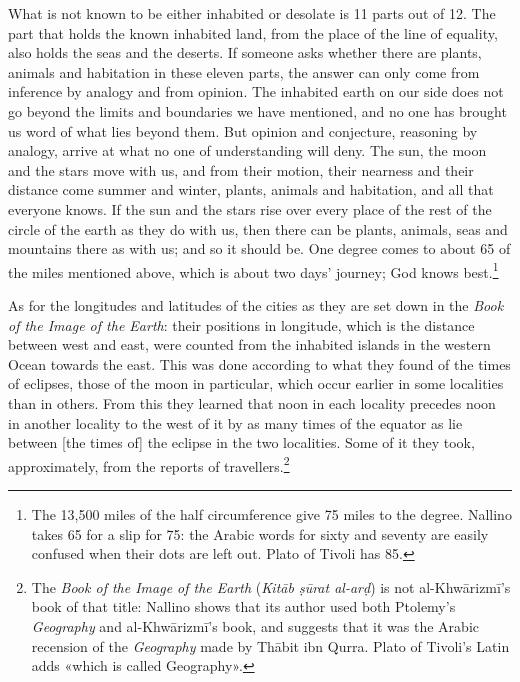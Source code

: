 \documentclass[11pt]{article}
\begin{document}
\par What is not known to be either inhabited or desolate is 11 parts out of 12. The part that holds the known inhabited land, from the place of the line of equality, also holds the seas and the deserts. If someone asks whether there are plants, animals and habitation in these eleven parts, the answer can only come from inference by analogy and from opinion. The inhabited earth on our side does not go beyond the limits and boundaries we have mentioned, and no one has brought us word of what lies beyond them. But opinion and conjecture, reasoning by analogy, arrive at what no one of understanding will deny. The sun, the moon and the stars move with us, and from their motion, their nearness and their distance come summer and winter, plants, animals and habitation, and all that everyone knows. If the sun and the stars rise over every place of the rest of the circle of the earth as they do with us, then there can be plants, animals, seas and mountains there as with us; and so it should be. One degree comes to about 65 of the miles mentioned above, which is about two days' journey; God knows best.\footnote{The 13,500 miles of the half circumference give 75 miles to the degree. Nallino takes 65 for a slip for 75: the Arabic words for sixty and seventy are easily confused when their dots are left out. Plato of Tivoli has 85.}\par
\par As for the longitudes and latitudes of the cities as they are set down in the \emph{Book of the Image of the Earth}: their positions in longitude, which is the distance between west and east, were counted from the inhabited islands in the western Ocean towards the east. This was done according to what they found of the times of eclipses, those of the moon in particular, which occur earlier in some localities than in others. From this they learned that noon in each locality precedes noon in another locality to the west of it by as many times of the equator as lie between [the times of] the eclipse in the two localities. Some of it they took, approximately, from the reports of travellers.\footnote{The \emph{Book of the Image of the Earth} (\emph{Kitāb ṣūrat al-arḍ}) is not al-Khwārizmī's book of that title: Nallino shows that its author used both Ptolemy's \emph{Geography} and al-Khwārizmī's book, and suggests that it was the Arabic recension of the \emph{Geography} made by Thābit ibn Qurra. Plato of Tivoli's Latin adds «which is called Geography».}\par
\end{document}
